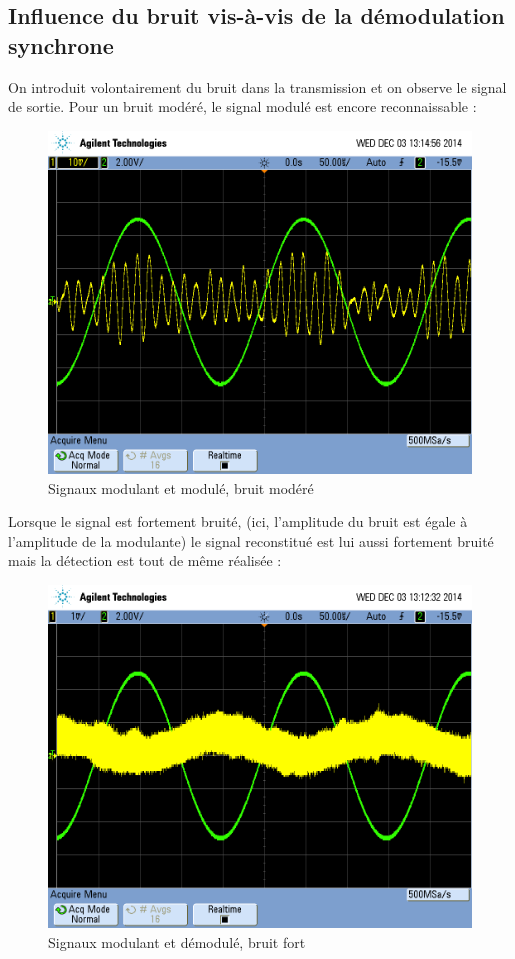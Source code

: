 \documentclass[../../Cours_M1.tex]{subfiles}
\begin{document}
\subsection{Influence du bruit vis-à-vis de la démodulation synchrone}

On introduit volontairement du bruit dans la transmission et on observe le signal de sortie. Pour un bruit modéré, le signal modulé est encore reconnaissable :

\begin{figure}[h!]
\centering
\includegraphics[scale=0.2]{NoiseMod.png}
\caption{Signaux modulant et modulé, bruit modéré}
\end{figure}

Lorsque le signal est fortement bruité, (ici, l'amplitude du bruit est égale à l'amplitude de la modulante) le signal reconstitué est lui aussi fortement bruité mais la détection est tout de même réalisée :

\begin{figure}[h!]
\centering
\includegraphics[scale=0.2]{NoiseMAX.png}
\caption{Signaux modulant et démodulé, bruit fort}
\end{figure}
\end{document}

